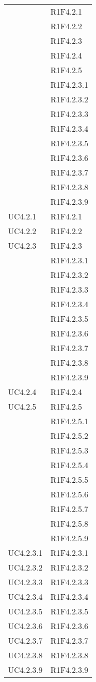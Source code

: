 \begin{longtable}{|>{\centering}m{5cm}|m{5cm}<{\centering}|}
{UC4.2}&{R1F4.2.1}\\
&{R1F4.2.2}\\
&{R1F4.2.3}\\
&{R1F4.2.4}\\
&{R1F4.2.5}\\
&{R1F4.2.3.1}\\
&{R1F4.2.3.2}\\
&{R1F4.2.3.3}\\
&{R1F4.2.3.4}\\
&{R1F4.2.3.5}\\
&{R1F4.2.3.6}\\
&{R1F4.2.3.7}\\
&{R1F4.2.3.8}\\
&{R1F4.2.3.9}\\ \hline
{UC4.2.1}&{R1F4.2.1}\\ \hline
{UC4.2.2}&{R1F4.2.2}\\ \hline
{UC4.2.3}&{R1F4.2.3}\\
&{R1F4.2.3.1}\\
&{R1F4.2.3.2}\\
&{R1F4.2.3.3}\\
&{R1F4.2.3.4}\\
&{R1F4.2.3.5}\\
&{R1F4.2.3.6}\\
&{R1F4.2.3.7}\\
&{R1F4.2.3.8}\\
&{R1F4.2.3.9}\\ \hline
{UC4.2.4}&{R1F4.2.4}\\ \hline
{UC4.2.5}&{R1F4.2.5}\\
&{R1F4.2.5.1}\\
&{R1F4.2.5.2}\\
&{R1F4.2.5.3}\\
&{R1F4.2.5.4}\\
&{R1F4.2.5.5}\\
&{R1F4.2.5.6}\\
&{R1F4.2.5.7}\\
&{R1F4.2.5.8}\\
&{R1F4.2.5.9}\\ \hline
{UC4.2.3.1}&{R1F4.2.3.1}\\ \hline
{UC4.2.3.2}&{R1F4.2.3.2}\\ \hline
{UC4.2.3.3}&{R1F4.2.3.3}\\ \hline
{UC4.2.3.4}&{R1F4.2.3.4}\\ \hline
{UC4.2.3.5}&{R1F4.2.3.5}\\ \hline
{UC4.2.3.6}&{R1F4.2.3.6}\\ \hline
{UC4.2.3.7}&{R1F4.2.3.7}\\ \hline
{UC4.2.3.8}&{R1F4.2.3.8}\\ \hline
{UC4.2.3.9}&{R1F4.2.3.9}\\ \hline


\end{longtable}
